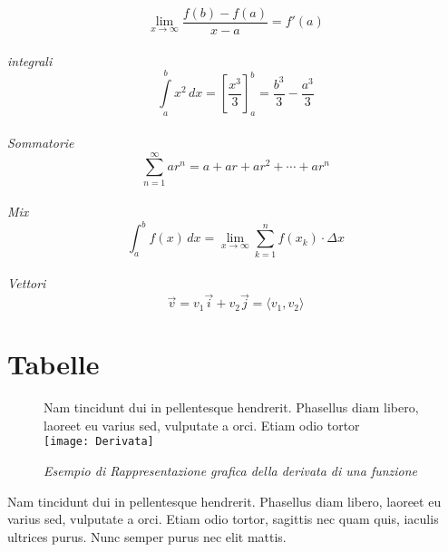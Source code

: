 \documentclass[11pt]{article}
\begin{document}


\begin{equation}
	\displaystyle{\lim \limits_{x \to \infty} \frac{f(b)-f(a)}{x-a}=f'(a)}
\end{equation}\\[1cm]
\emph{integrali}
\begin{equation}
	\displaystyle{\int \limits_{a}^{b}x^2 \,dx=\left[\frac{x^3}{3}\right]_{a}^{b}=\frac{b^3}{3}-\frac{a^3}{3}}
\end{equation}\\[1cm]
\emph{Sommatorie}
\begin{equation}
	\displaystyle{\sum \limits_{n=1}^{\infty}ar^n=a+ar+ar^2+\cdots+ar^n}
\end{equation}\\[1cm]
\emph{Mix}
\begin{equation}
	\displaystyle{\int_a^b{f(x) \,dx=\lim \limits_{x \to \infty} \sum \limits_{k=1}^{n}f(x_k) \cdot \Delta x}}
\end{equation}\\[1cm]
\emph{Vettori}
\begin{equation}
	\displaystyle{\vec{v}=v_1 \vec{i}+v_2 \vec{j}=\langle v_1, v_2 \rangle}
\end{equation}


\section{Tabelle}
\begin{figure}[h!]
Nam tincidunt dui in pellentesque hendrerit. Phasellus diam libero, laoreet eu varius sed, vulputate a orci. Etiam odio tortor\\[5mm]
\texttt{[image: Derivata]}
\caption {\textit{Esempio di Rappresentazione grafica della derivata di una funzione}}
\end{figure}
\noindent
Nam tincidunt dui in pellentesque hendrerit. Phasellus diam libero, laoreet eu varius sed, vulputate a orci. Etiam odio tortor, sagittis nec quam quis, iaculis ultrices purus. Nunc semper purus nec elit mattis.\\
\end{document}
